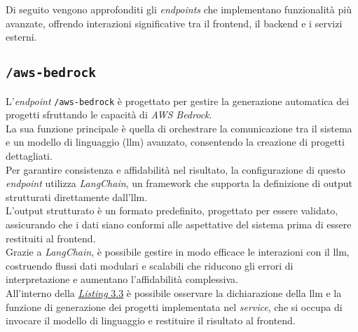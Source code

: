 \noindent Di seguito vengono approfonditi gli \textit{endpoints} che implementano funzionalità più avanzate, offrendo interazioni significative tra il \gls{frontend}, il \gls{backend} e i servizi esterni.

\subsection*{\texttt{/aws-bedrock}}
L’\textit{endpoint} \texttt{/aws-bedrock} è progettato per gestire la generazione automatica dei progetti sfruttando le capacità di \textit{AWS Bedrock}.\\
La sua funzione principale è quella di orchestrare la comunicazione tra il sistema e un modello di linguaggio (\gls{llm}) avanzato, consentendo la creazione di progetti dettagliati.\\

\noindent Per garantire consistenza e affidabilità nel risultato, la configurazione di questo \textit{endpoint} utilizza \textit{LangChain}, un framework che supporta la definizione di output strutturati direttamente dall’\gls{llm}.\\
L’output strutturato è un formato predefinito, progettato per essere validato, assicurando che i dati siano conformi alle aspettative del sistema prima di essere restituiti al \gls{frontend}.\\
Grazie a \textit{LangChain}, è possibile gestire in modo efficace le interazioni con il \gls{llm}, costruendo flussi dati modulari e scalabili che riducono gli errori di interpretazione e aumentano l’affidabilità complessiva.\\

\noindent All'interno della {\hyperref[lst:funzione-generazione-progetto]{\textit{Listing} 3.3}} è possibile osservare la dichiarazione della \gls{llm} e la funzione di generazione dei progetti implementata nel \textit{service}, che si occupa di invocare il modello di linguaggio e restituire il risultato al \gls{frontend}.


